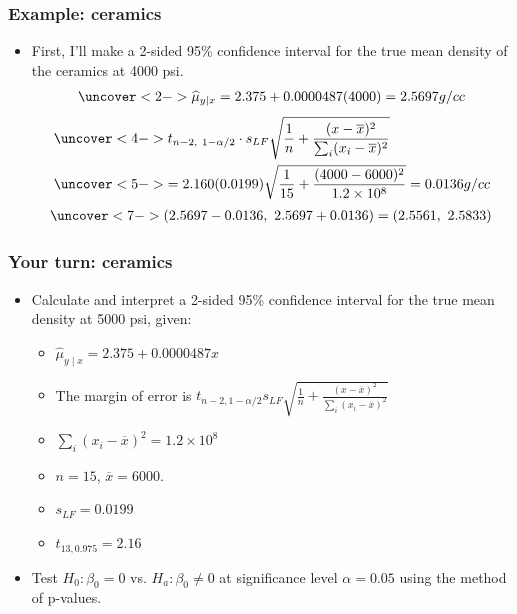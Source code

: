 \documentclass[handout]{beamer}\usepackage[]{graphicx}\usepackage[]{color}
\providecommand{\ov}[1]{\overline{#1}}
\providecommand{\wh}[1]{\widehat{#1}}
\numberwithin{equation}{section}
\begin{document}
\begin{frame}
\frametitle{Example: ceramics} \small
\begin{itemize}
\item First, I'll make a 2-sided 95\% confidence interval for the true mean density of the ceramics at 4000 psi.
\begin{align*}
\uncover<2->{\wh{\mu}_{y \mid x} = 2.375 + 0.0000487 (4000) = 2.5697 g/cc}
\end{align*}
\begin{align*}
&\uncover<4->{ t_{n - 2, \ 1 - \alpha/2} \cdot  s_{LF} \sqrt{    \frac{1}{n} +  \frac{(x - \ov{x})^2  }{\sum_i(x_i - \ov{x})^2}}}  \\
 &\uncover<5->{=  2.160(0.0199) \sqrt{\frac{1}{15} + \frac{(4000 - 6000)^2}{1.2 \times 10^8}} = 0.0136 g/cc}
\end{align*}
\begin{align*}
\uncover<7->{(2.5697 - 0.0136, \ 2.5697 + 0.0136) = (2.5561, \ 2.5833)}
\end{align*}
\end{itemize}
\end{frame}


\begin{frame}
\frametitle{Your turn: ceramics}

\begin{itemize}
\item Calculate and interpret a 2-sided 95\% confidence interval for the true mean density at 5000 psi, given:
\begin{itemize}
\item $\wh{\mu}_{y \mid x} = 2.375 + 0.0000487 x$
\item The margin of error is $t_{n - 2, 1 - \alpha/2} s_{LF} \sqrt{\frac{1}{n} +  \frac{(x - \ov{x})^2  }{\sum_i(x_i - \ov{x})^2}}$
\item $\sum_{i}(x_i - \ov{x})^2 = 1.2 \times 10^8$
\item $n = 15$, $\ov{x} = 6000$.
\item $s_{LF} = 0.0199$
\item $t_{13, 0.975} = 2.16$
\end{itemize}
\item Test $H_0: \beta_0 = 0$ vs. $H_a: \beta_0 \ne 0$ at significance level $\alpha = 0.05$ using the method of p-values.
\end{itemize}
\end{frame}
\end{document}
